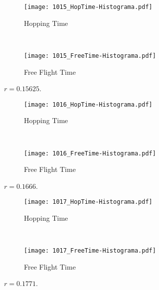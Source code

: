 \documentclass[a4paper,10pt]{article}
\begin{document}
\begin{figure}[h]
        \centering
        \begin{subfigure}[b]{0.45\textwidth}
                \centering
                \texttt{[image: 1015\_HopTime-Histograma.pdf]}
                \caption{Hopping Time}              
        \end{subfigure}%
        ~ %
        \begin{subfigure}[b]{0.45\textwidth}
                \centering
                \texttt{[image: 1015\_FreeTime-Histograma.pdf]}
                \caption{Free Flight Time}                
        \end{subfigure}       
        \caption{ $r=0.15625$. }
\end{figure}

\begin{figure}[h]
        \centering
        \begin{subfigure}[b]{0.45\textwidth}
                \centering
                \texttt{[image: 1016\_HopTime-Histograma.pdf]}
                \caption{Hopping Time}              
        \end{subfigure}%
        ~ %
        \begin{subfigure}[b]{0.45\textwidth}
                \centering
                \texttt{[image: 1016\_FreeTime-Histograma.pdf]}
                \caption{Free Flight Time}                
        \end{subfigure}       
        \caption{ $r=0.1666$. }
\end{figure}


\begin{figure}[h]
        \centering
        \begin{subfigure}[b]{0.45\textwidth}
                \centering
                \texttt{[image: 1017\_HopTime-Histograma.pdf]}
                \caption{Hopping Time}              
        \end{subfigure}%
        ~ %
        \begin{subfigure}[b]{0.45\textwidth}
                \centering
                \texttt{[image: 1017\_FreeTime-Histograma.pdf]}
                \caption{Free Flight Time}                
        \end{subfigure}       
        \caption{ $r=0.1771$. }

\end{figure}
\end{document}
